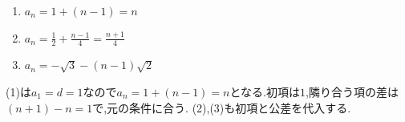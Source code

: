 \noindent{}\par\nobreak
\begin{enumerate}[label=(\arabic*),parsep=3pt,format=\bookitemlink{example-arithmetic-1}{answer}{problem}]
  \item $\displaystyle a_n=1+(n-1)=n$
  \item $\displaystyle a_n=\frac12+\frac{n-1}{4}
      =\frac{n+1}{4}$
  \item $\displaystyle a_n=-\sqrt3-(n-1)\sqrt2$
\end{enumerate}

\noindent{}\par\nobreak
(1)は$a_1=d=1$なので$a_n=1+(n-1)=n$となる.初項は$1$,隣り合う項の差は$(n+1)-n=1$で,元の条件に合う.
(2),(3)も初項と公差を代入する.

